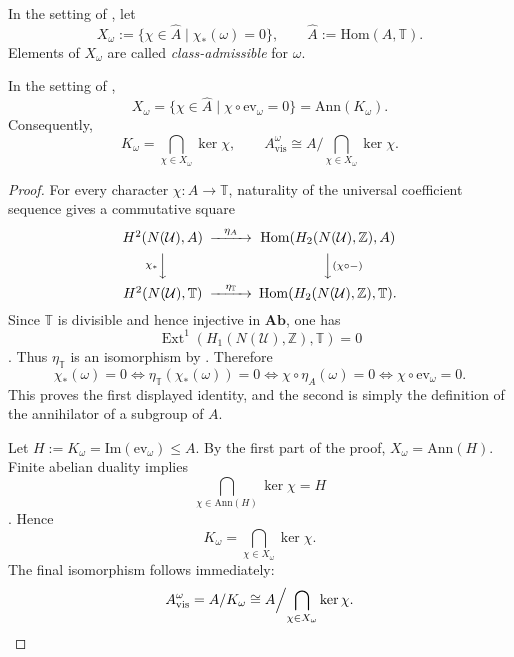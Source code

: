 \begin{definition}\label{def:class-admissible-character}
In the setting of , let
\[
X_{\omega}:=\{\chi\in\widehat A\mid \chi_*(\omega)=0\},
\qquad
\widehat A:=\mathrm{Hom}(A,\mathbb T).
\]
Elements of $X_{\omega}$ are called \emph{class-admissible} for $\omega$.
\end{definition}

\begin{theorem}\label{thm:intrinsic-visible-quotient}
In the setting of ,
\[
X_{\omega}
=
\{\chi\in\widehat A\mid \chi\circ \mathrm{ev}_{\omega}=0\}
=
\mathrm{Ann}(K_{\omega}).
\]
Consequently,
\[
K_{\omega}
=
\bigcap_{\chi\in X_{\omega}}\ker\chi,
\qquad
A_{\mathrm{vis}}^{\omega}\cong A\Big/\!\bigcap_{\chi\in X_{\omega}}\ker\chi.
\]
\end{theorem}

\begin{proof}
For every character $\chi:A\to\mathbb T$, naturality of the universal coefficient sequence gives a commutative square
\[
\begin{CD}
H^2(N(\mathcal U),A) @>\eta_A>> \mathrm{Hom}(H_2(N(\mathcal U),\mathbb Z),A) \\
@V\chi_*VV @VV(\chi\circ -)V \\
H^2(N(\mathcal U),\mathbb T) @>\eta_{\mathbb T}>> \mathrm{Hom}(H_2(N(\mathcal U),\mathbb Z),\mathbb T).
\end{CD}
\]
Since $\mathbb T$ is divisible and hence injective in $\mathbf{Ab}$, one has
\[
\operatorname{Ext}^1(H_1(N(\mathcal U),\mathbb Z),\mathbb T)=0
\]
\cite[Sec.~2.3]{Weibel1994}. Thus $\eta_{\mathbb T}$ is an isomorphism by . Therefore
\[
\chi_*(\omega)=0
\Longleftrightarrow
\eta_{\mathbb T}(\chi_*(\omega))=0
\Longleftrightarrow
\chi\circ \eta_A(\omega)=0
\Longleftrightarrow
\chi\circ \mathrm{ev}_{\omega}=0.
\]
This proves the first displayed identity, and the second is simply the definition of the annihilator of a subgroup of $A$.

Let $H:=K_{\omega}=\mathrm{Im}(\mathrm{ev}_{\omega})\le A$. By the first part of the proof, $X_{\omega}=\mathrm{Ann}(H)$. Finite abelian duality implies
\[
\bigcap_{\chi\in \mathrm{Ann}(H)}\ker\chi=H
\]
\cite[Chaps.~5, 12]{DummitFoote2004}. Hence
\[
K_{\omega}
=
\bigcap_{\chi\in X_{\omega}}\ker\chi.
\]
The final isomorphism follows immediately:
\[
A_{\mathrm{vis}}^{\omega}
=
A/K_{\omega}
\cong
A\Big/\!\bigcap_{\chi\in X_{\omega}}\ker\chi.
\qedhere
\]
\end{proof}

